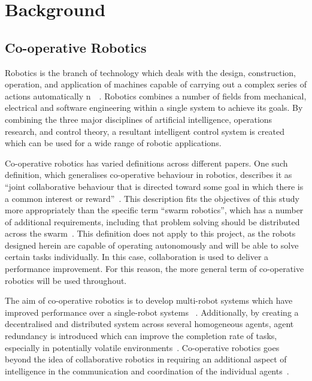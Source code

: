 
\chapter{Background}\label{litreview}

\section{Co-operative Robotics}\label{litreview/robotics}
Robotics is the branch of technology which deals with the design, construction, 
operation, and application of machines capable of carrying out a complex series of 
actions automatically n~\cite{robotdef}~\cite{roboticsdef}. Robotics 
combines a number of fields from mechanical,
electrical and software engineering within a single system to achieve its goals. By 
combining the three major disciplines of artificial intelligence, operations 
research, and control theory, a resultant intelligent control system is created~\cite{saridis1983intelligent} which can be 
used for a wide range of robotic applications.

Co-operative robotics has varied definitions across different papers. One such
definition, which generalises co-operative behaviour in robotics, describes it 
as ``joint collaborative behaviour that is directed toward some goal in which 
there is a common interest or reward''~\cite{barnes1991behaviour}. This 
description fits the objectives of this study more appropriately than the 
specific term ``swarm robotics'',  which has a number of additional requirements, 
including that problem solving should be distributed across the swarm~\cite{sahin04}. This definition does not apply to this project, as the robots 
designed herein are capable of operating autonomously and will be able to solve 
certain tasks individually. In this case, collaboration is used to deliver a 
performance improvement. For this reason, the more general term of co-operative 
robotics will be used throughout. 

The aim of co-operative robotics is to  develop multi-robot systems which have improved performance over a single-robot systems~
\cite{premvuti1990consideration}. Additionally, by creating a decentralised and 
distributed system across several homogeneous agents, agent redundancy is 
introduced which can improve the completion rate of tasks, especially in 
potentially volatile environments~\cite{beckers1994local, parker95}.
Co-operative robotics goes beyond the idea of collaborative robotics in
requiring an additional aspect of intelligence in the communication and
coordination of the individual agents~\cite{cao1995cooperative}.

